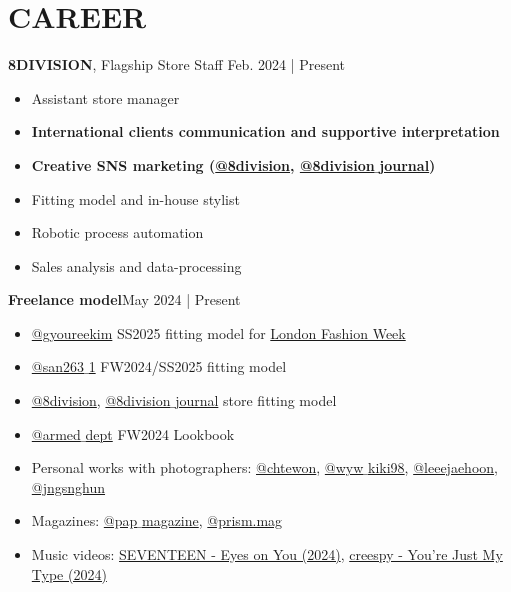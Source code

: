 \documentclass[a4paper,10pt]{extarticle}
\begin{document}
\section*{CAREER}
\noindent
\textbf{8DIVISION}, Flagship Store Staff \hfill Feb. 2024 | Present
\begin{itemize}
	\item Assistant store manager
	\item \textbf{International clients communication and supportive interpretation}
	\item \textbf{Creative SNS marketing (\href{https://instagram.com/8division}{@8division}, \href{https://instagram.com/8division_journal}{@8division$\_$journal})}
	\item Fitting model and in-house stylist
	\item Robotic process automation
	\item Sales analysis and data-processing
\end{itemize}
\textbf{Freelance model}\hfill May 2024 | Present
\begin{itemize}
	\item \href{https://instagram.com/gyoureekim}{@gyoureekim} SS2025 fitting model for \href{https://instagram.com/londonfashionweek}{London Fashion Week}
	\item \href{https://instagram.com/san263_1}{@san263$\_$1} FW2024/SS2025 fitting model
	\item \href{https://instagram.com/8division}{@8division}, \href{https://instagram.com/8division_journal}{@8division$\_$journal} store fitting model
	\item \href{https://instagram.com/armed_dept}{@armed$\_$dept} FW2024 Lookbook
	\item Personal works with photographers: \href{https://instagram.com/chtewon}{@chtewon}, \href{https://instagram.com/wyw_kiki98}{@wyw$\_$kiki98}, \href{https://instagram.com/leeejaehoon}{@leeejaehoon}, \href{https://instagram.com/jngsnghun}{@jngsnghun}
	\item Magazines: \href{https://instagram.com/pap_magazine}{@pap$\_$magazine}, \href{https://instagram.com/prism.mag}{@prism.mag}
	\item Music videos: \href{https://www.youtube.com/watch?v=JjvX09nG2F0}{SEVENTEEN - Eyes on You (2024)}, \href{https://www.youtube.com/watch?v=9FoALFoanow}{creespy - You're Just My Type (2024)}
\end{itemize}
\end{document}
